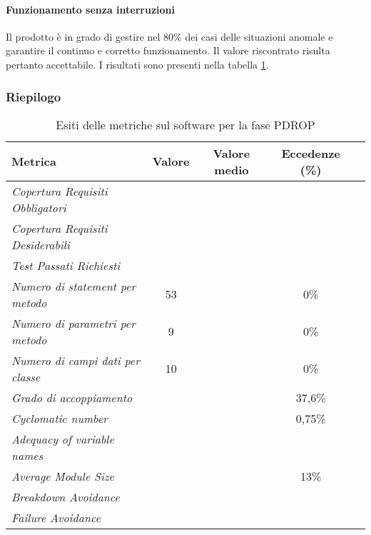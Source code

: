 \documentclass[../PianoDiQualifica.tex]{subfiles}
\begin{document}
\begin{appendices}
			\paragraph{Funzionamento senza interruzioni}	
			Il prodotto è in grado di gestire nel 80\% dei casi delle situazioni anomale e garantire il continuo e corretto funzionamento. Il valore riscontrato risulta pertanto accettabile.
			I risultati sono presenti nella tabella \ref{tab:esiti_metriche_sul_software}.
			
			\subsubsection{Riepilogo}
			\begin{table}[H]
				\centering
				\begin{tabular}{l * {4}{c}}
					\toprule
					\textbf{Metrica} & \textbf{Valore} & \textbf{Valore medio} & \textbf{Eccedenze (\%) }\\
					\midrule
					\textit{Copertura Requisiti Obbligatori}  & \color{red}{77,67\%} & & \\
					\textit{Copertura Requisiti Desiderabili}  & \color{red}{76,92\%} & & \\
					\textit{Test Passati Richiesti} & \color{red}{46,06\%} & & \\
					\textit{Numero di statement per metodo} & 53 & \color{dkgreen}{4,25} & 0\% \\
					\textit{Numero di parametri per metodo} & 9 & \color{dkgreen}{0,80} & 0\% \\
					\textit{Numero di campi dati per classe} & 10 & \color{dkgreen}{2,65} & 0\% \\
					\textit{Grado di accoppiamento}  & & \color{red}{10,11} & 37,6\% \\
					\textit{Cyclomatic number} & & \color{dkgreen}{1,69} & 0,75\% \\
					\textit{Adequacy of variable names}  & \color{dkgreen}{100\%} & & \\
					\textit{Average Module Size} & & \color{dkgreen}{19,84} & 13\% \\
					\textit{Breakdown Avoidance}  & \color{dkgreen}{80\%} & & \\
					\textit{Failure Avoidance}  & \color{dkgreen}{80\%} & & \\
					\bottomrule
				\end{tabular}
				\caption{Esiti delle metriche sul software per la fase PDROP}
				\label{tab:esiti_metriche_sul_software}
			\end{table}	
\end{appendices}
\end{document}

